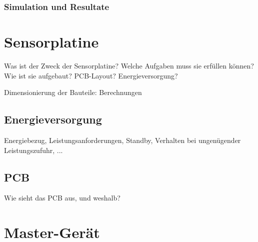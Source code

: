 \subsubsection{Simulation und Resultate}
\label{subsubsec:hw:ask:simu}


\clearpage
\section{Sensorplatine}
\label{sec:hw:sensorplatine}

Was  ist der  Zweck  der Sensorplatine? Welche  Aufgaben  muss sie  erf\"ullen
k\"onnen? Wie ist sie aufgebaut? PCB-Layout? Energieversorgung?

\anweisung Dimensionierung der Bauteile: Berechnungen

\subsection{Energieversorgung}
\label{subsec:sensor:pcb}

Energiebezug,  Leistungsanforderungen, Standby,  Verhalten bei  ungen\"ugender
Leistungszufuhr, ...


\subsection{PCB}
\label{subsec:sensor:pcb}

Wie sieht das PCB aus, und weshalb?

\section{Master-Ger\"at}
\label{sec:hw:mastergerat}

